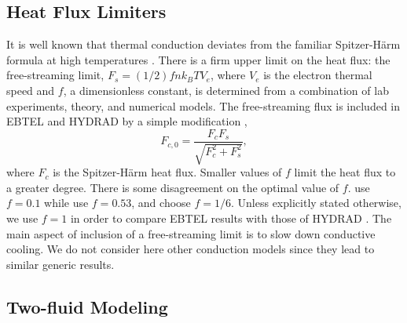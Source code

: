 \subsection{Heat Flux Limiters}\label{hot-plasma:subsec:hf_theory}
    
It is well known that thermal conduction deviates from the familiar Spitzer-H{\"a}rm formula \citep{spitzer_transport_1953} at high temperatures \citep[e.g.][]{ljepojevic_heat_1989}. There is a firm upper limit on the heat flux: the free-streaming limit, $F_s=(1/2)fnk_BTV_e$, where $V_e$ is the electron thermal speed and $f$, a dimensionless constant, is determined from a combination of lab experiments, theory, and numerical models. The free-streaming flux is included in EBTEL and HYDRAD by a simple modification \citep{klimchuk_highly_2008},
\begin{equation}
    F_{c,0} = \frac{F_cF_s}{\sqrt{F_c^2 + F_s^2}},
\end{equation}
where $F_c$ is the Spitzer-H{\"a}rm heat flux. Smaller values of $f$ limit the heat flux to a greater degree. There is some disagreement on the optimal value of $f$. \citet{luciani_nonlocal_1983} use $f=0.1$ while \citet{karpen_nonlocal_1987} use $f=0.53$, and \citet{patsourakos_coronal_2005} choose $f=1/6$. Unless explicitly stated otherwise, we use $f = 1$ in order to compare EBTEL results with those of HYDRAD \citep[see appendix of][]{bradshaw_influence_2013}. The main aspect of inclusion of a free-streaming limit is to slow down conductive cooling. We do not consider here other conduction models \citep[e.g. the non-local model discussed in the coronal context by][]{karpen_nonlocal_1987,ciaravella_non-local_1991,west_lifetime_2008} since they lead to similar generic results.

\subsection{Two-fluid Modeling}\label{subsec:two_fluid_theory}
    
